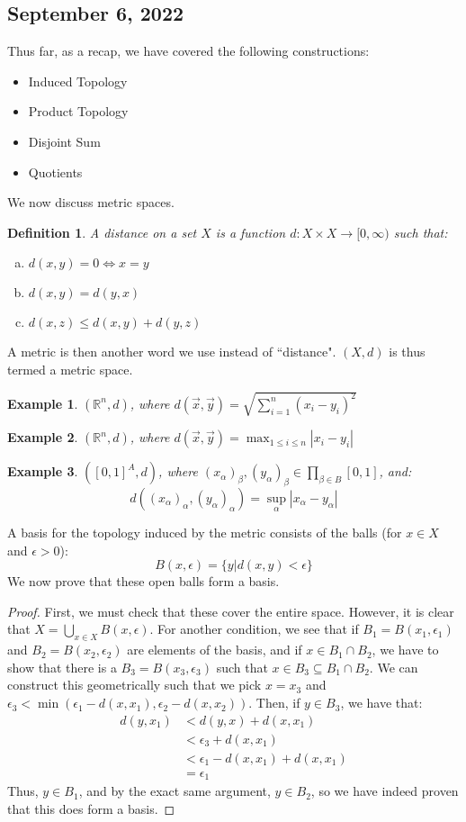 \documentclass{article}
\newcommand{\R}{\mathbb{R}}
\newtheorem{example}{Example}
\newtheorem{definition}{Definition}
\begin{document}
\subsection{September 6, 2022}
Thus far, as a recap, we have covered the following constructions:
\begin{itemize}
    \item Induced Topology
    \item Product Topology
    \item Disjoint Sum
    \item Quotients
\end{itemize}
We now discuss metric spaces.
\begin{definition}
A distance on a set $X$ is a function $d:X\times X\rightarrow [0,\infty)$ such that:
\begin{enumerate}[(a)]
    \item $d(x,y)=0\iff x=y$
    \item $d(x,y)=d(y,x)$
    \item $d(x,z)\leq d(x,y)+d(y,z)$
\end{enumerate}
\end{definition}
A metric is then another word we use instead of ``distance". $(X,d)$ is thus termed a metric space.
\begin{example}
$(\R^n,d)$, where $d(\vec{x},\vec{y})=\sqrt{\displaystyle\sum_{i=1}^n(x_i-y_i)^2}$ 
\end{example}
\begin{example}
$(\R^n,d)$, where $d(\vec{x},\vec{y})=\displaystyle\max_{1\leq i \leq n}{|x_i-y_i|}$
\end{example}
\begin{example}
$([0,1]^A,d)$, where $(x_\alpha)_\beta,(y_\alpha)_\beta\in\displaystyle\prod_{\beta\in B}[0,1]$, and:
$$d((x_\alpha)_\alpha,(y_\alpha)_\alpha)=\sup_\alpha{|x_\alpha-y_\alpha|}$$
\end{example}
A basis for the topology induced by the metric consists of the balls (for $x\in X$ and $\epsilon >0$):
$$B(x,\epsilon)=\{y|d(x,y)<\epsilon\}$$
We now prove that these open balls form a basis.
\begin{proof}
First, we must check that these cover the entire space. However, it is clear that $X=\displaystyle\bigcup_{x\in X}B(x,\epsilon)$. For another condition, we see that if $B_1=B(x_1,\epsilon_1)$ and $B_2=B(x_2,\epsilon_2)$ are elements of the basis, and if $x\in B_1\cap B_2$, we have to show that there is a $B_3=B(x_3,\epsilon_3)$ such that $x\in B_3\subseteq B_1\cap B_2$. We can construct this geometrically such that we pick $x=x_3$ and $\epsilon_3 <\min{(\epsilon_1-d(x,x_1),\epsilon_2-d(x,x_2))}$. Then, if $y\in B_3$, we have that:
\begin{align*}
    d(y,x_1)&<d(y,x)+d(x,x_1)\\
    &<\epsilon_3 + d(x,x_1)\\
    &<\epsilon_1-d(x,x_1)+d(x,x_1)\\
    &=\epsilon_1
\end{align*}
Thus, $y\in B_1$, and by the exact same argument, $y\in B_2$, so we have indeed proven that this does form a basis.
\end{proof}
\end{document}
